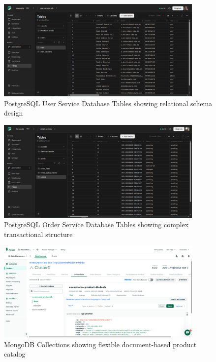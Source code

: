 \begin{figure}[H]
\centering
\includegraphics[width=0.9\textwidth]{figures/chapter5/postgresql-database-user-tables.png}
\caption{PostgreSQL User Service Database Tables showing relational schema design}
\label{fig:postgresql-user-tables}
\end{figure}

\begin{figure}[H]
\centering
\includegraphics[width=0.9\textwidth]{figures/chapter5/postgresql-database-order-tables.png}
\caption{PostgreSQL Order Service Database Tables showing complex transactional structure}
\label{fig:postgresql-order-tables}
\end{figure}

\begin{figure}[H]
\centering
\includegraphics[width=0.9\textwidth]{figures/chapter5/mongodb-collections.png}
\caption{MongoDB Collections showing flexible document-based product catalog}
\label{fig:mongodb-collections}
\end{figure}

